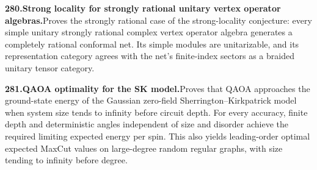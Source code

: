 \documentclass[11pt,a4paper]{article}
\begin{document}
  \par \begin{minipage}{\linewidth}
  \fontsize{10.5}{12.6}\selectfont\RaggedRight
  \hypertarget{result 280}{}
  {\bfseries\textcolor{muted}{280.}\enspace Strong locality for strongly rational unitary vertex operator algebras.}\enspace Proves the strongly rational case of the strong-locality conjecture: every simple unitary strongly rational complex vertex operator algebra generates a completely rational conformal net. Its simple modules are unitarizable, and its representation category agrees with the net’s finite-index sectors as a braided unitary tensor category.\par
  \end{minipage}\par\vspace{5pt}



  \par \begin{minipage}{\linewidth}
  \fontsize{10.5}{12.6}\selectfont\RaggedRight
  \hypertarget{result 281}{}
  {\bfseries\textcolor{muted}{281.}\enspace QAOA optimality for the SK model.}\enspace Proves that QAOA approaches the ground-state energy of the Gaussian zero-field Sherrington--Kirkpatrick model when system size tends to infinity before circuit depth. For every accuracy, finite depth and deterministic angles independent of size and disorder achieve the required limiting expected energy per spin. This also yields leading-order optimal expected MaxCut values on large-degree random regular graphs, with size tending to infinity before degree.\par
  \end{minipage}\par\vspace{5pt}
\end{document}
